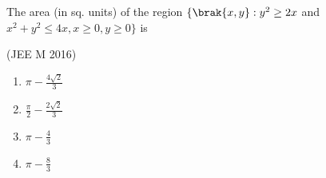 	\item The area (in sq. units) of the region $\{\brak{x,y}:y^2\geq2x$ and $x^2+y^2\leq4x, x\geq0, y\geq0\}$ is

		\hfill{(JEE M 2016)}

		\begin{multicols}{2}
			\begin{enumerate}
				\item $\pi-\frac{4\sqrt{2}}{3}$
				\item $\frac{\pi}{2}-\frac{2\sqrt{2}}{3}$
				\item $\pi-\frac{4}{3}$
				\item $\pi-\frac{8}{3}$ 
			\end{enumerate}
		\end{multicols} 
